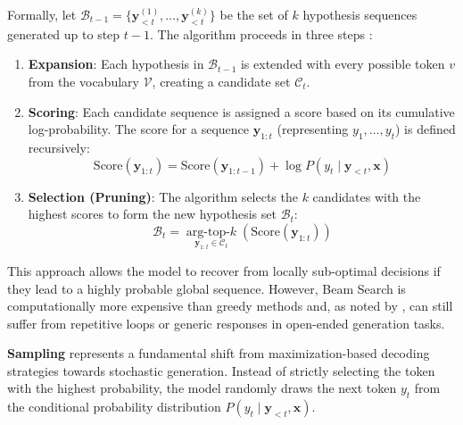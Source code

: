 Formally, let $\mathcal{B}_{t-1} = \{\mathbf{y}^{(1)}_{<t}, \dots, 
\mathbf{y}^{(k)}_{<t}\}$ be the set of $k$ hypothesis sequences 
generated up to step $t-1$. The algorithm proceeds in three steps
\parencite{freitag-al-onaizan-2017-beam}:
\begin{enumerate}
	\item \textbf{Expansion}: Each hypothesis in 
	    $\mathcal{B}_{t-1}$ is extended with every possible token
	    $v$ from the vocabulary $\mathcal{V}$, creating a candidate
	    set $\mathcal{C}_t$.

	\item \textbf{Scoring}: Each candidate sequence is assigned a 
	    score based on its cumulative log-probability. The score 
	    for a sequence $\mathbf{y}_{1:t}$ 
	    (representing $y_1,\dots,y_t$)
	    is defined recursively:
	    \begin{equation}
		\text{Score}(\mathbf{y}_{1:t})
		    = \text{Score}(\mathbf{y}_{1:t-1}) 
		    + \log P(y_t \mid \mathbf{y}_{<t}, \mathbf{x})
	    	\label{eq:Beam_Score}
	    \end{equation}

	\item \textbf{Selection (Pruning)}: The algorithm selects the
	    $k$ candidates with the highest scores to form the new
	    hypothesis set $\mathcal{B}_t$:
	    \begin{equation}
		\mathcal{B}_t = 
	    \operatorname*{arg-top-\textit{k}}_{\mathbf{y}_{1:t} \in \mathcal{C}_t}
	    \left(\text{Score}(\mathbf{y}_{1:t})\right)
	    	\label{eq:Beam_Selection}
	    \end{equation}
\end{enumerate}
This approach allows the model to recover from locally sub-optimal 
decisions if they lead to a highly probable global sequence. However,
Beam Search is computationally more expensive than greedy methods and, 
as noted by \textcite{holtzman2020curiouscaseneuraltext}, can still
suffer from repetitive loops or generic responses in open-ended
generation tasks.

\textbf{Sampling} represents a fundamental shift from 
maximization-based decoding strategies towards stochastic generation.
Instead of strictly selecting the token with the highest probability, 
the model randomly draws the next token $y_t$ from the conditional 
probability distribution $P(y_t \mid \mathbf{y}_{<t}, \mathbf{x})$.

